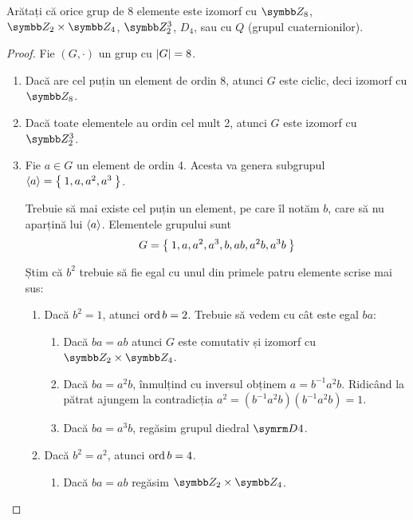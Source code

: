 \begin{exercise}
Arătați că orice grup de 8 elemente este izomorf cu \(\integersmod{8}\), \(\integersmod{2} \times \integersmod{4}\), \(\integersmod{2}^3\), \(D_4\), sau cu \(Q\) (grupul cuaternionilor).
\end{exercise}
\begin{proof}
Fie \((G, \cdot)\) un grup cu \(\left\lvert G \right\rvert = 8\).
\begin{enumerate}
    \item Dacă are cel puțin un element de ordin 8, atunci \(G\) este ciclic, deci izomorf cu \(\integersmod{8}\).
    
    \item Dacă toate elementele au ordin cel mult 2, atunci \(G\) este izomorf cu \(\integersmod{2}^3\).
    
    \item Fie \(a \in G\) un element de ordin 4. Acesta va genera subgrupul \(\left\langle a \right\rangle = \Set{ 1, a, a^2, a^3 }\).
    
    Trebuie să mai existe cel puțin un element, pe care îl notăm \(b\), care să nu aparțină lui \(\left\langle a \right\rangle\). Elementele grupului sunt
    \[
        G = \Set{ 1, a, a^2, a^3, b, a b, a^2 b, a^3 b }
    \]
    
    \pagebreak
    
    Știm că \(b^2\) trebuie să fie egal cu unul din primele patru elemente scrise mai sus:
    \begin{enumerate}
        \item Dacă \(b^2 = 1\), atunci \(\operatorname{ord} b = 2\). Trebuie să vedem cu cât este egal \(ba\):
        \begin{enumerate}
            \item Dacă \(ba = ab\) atunci \(G\) este comutativ și izomorf cu \(\integersmod{2} \times \integersmod{4}\).
            
            \item Dacă \(ba = a^2 b\), înmulțind cu inversul obținem \(a = b^{-1} a^2 b\). Ridicând la pătrat ajungem la contradicția \(a^2 = (b^{-1} a^2 b) (b^{-1} a^2 b) = 1\).
            
            \item Dacă \(ba = a^3 b\), regăsim grupul diedral \(\dihedralgroup{4}\).
        \end{enumerate}
        
        \item Dacă \(b^2 = a^2\), atunci \(\operatorname{ord} b = 4\).
        \begin{enumerate}
            \item Dacă \(ba = ab\) regăsim \(\integersmod{2} \times \integersmod{4}\).
            

\end{enumerate}
\end{enumerate}
\end{enumerate}
\end{proof}
